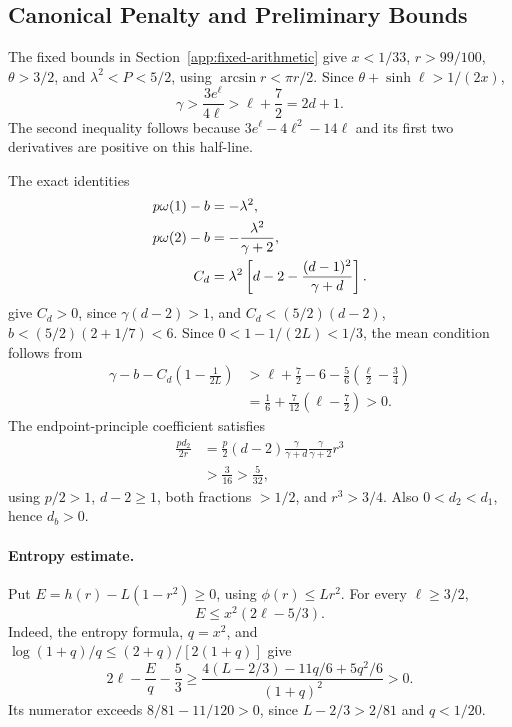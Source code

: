 \subsection{Canonical Penalty and Preliminary Bounds}
\label{app:canonical-prerequisites}

The fixed bounds in Section~\ref{app:fixed-arithmetic} give
\(x<1/33\), \(r>99/100\), \(\theta>3/2\), and
\(\lambda^2<P<5/2\), using \(\arcsin r<\pi r/2\).
Since \(\theta+\sinh\ell>1/(2x)\),
\begin{equation}
 \gamma>\frac{3e^\ell}{4\ell}>\ell+\frac72=2d+1.
 \label{eq:canonical-penalty-lower}
\end{equation}
The second inequality follows because \(3e^\ell-4\ell^2-14\ell\)
and its first two derivatives are positive on this half-line.

The exact identities
\begin{equation}
 \begin{split}
 p\omega(1)-b&=-\lambda^2,\\
 p\omega(2)-b&=-\frac{\lambda^2}{\gamma+2},\\
 C_d&=\lambda^2\left[d-2-\frac{(d-1)^2}{\gamma+d}\right].
 \end{split}
 \label{eq:canonical-multipliers}
\end{equation}
give \(C_d>0\), since \(\gamma(d-2)>1\), and
\(C_d<(5/2)(d-2)\), \(b<(5/2)(2+1/7)<6\).
Since \(0<1-1/(2L)<1/3\), the mean condition follows from
\begin{align*}
 \gamma-b-C_d\left(1-\frac1{2L}\right)
 &>\ell+\frac72-6-\frac56\left(\frac\ell2-\frac34\right)\\
 &=\frac16+\frac7{12}\left(\ell-\frac72\right)>0.
\end{align*}
The endpoint-principle coefficient satisfies
\begin{align*}
 \frac{p d_2}{2r}
 &=\frac p2(d-2)\frac\gamma{\gamma+d}
                   \frac\gamma{\gamma+2}r^3\\
 &>\frac3{16}>\frac5{32},
\end{align*}
using \(p/2>1\), \(d-2\ge1\), both fractions \(>1/2\), and
\(r^3>3/4\). Also \(0<d_2<d_1\), hence \(d_b>0\).

\paragraph{Entropy estimate.}
Put \(E=h(r)-L(1-r^2)\ge0\), using \(\phi(r)\le Lr^2\).
For every \(\ell\ge3/2\),
\begin{equation}
                     E\le x^2(2\ell-5/3).
 \label{eq:shared-entropy-error}
\end{equation}
Indeed, the entropy formula, \(q=x^2\), and
\(\log(1+q)/q\le(2+q)/[2(1+q)]\) give
\[
 2\ell-\frac E q-\frac53
 \ge\frac{4(L-2/3)-11q/6+5q^2/6}{(1+q)^2}>0.
\]
Its numerator exceeds \(8/81-11/120>0\), since
\(L-2/3>2/81\) and \(q<1/20\).


